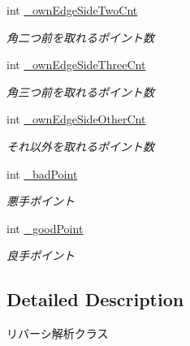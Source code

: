 \begin{DoxyCompactItemize}
int \hyperlink{class_reversi_wpf_1_1_reversi_anz_ab75875631362cfdda69f7d980a7406cd}{\+\_\+own\+Edge\+Side\+Two\+Cnt}
\begin{DoxyCompactList}\small\item\em 角二つ前を取れるポイント数 \end{DoxyCompactList}\item 
\mbox{\label{class_reversi_wpf_1_1_reversi_anz_a68cbd891eb9cf08e24855a4e518ab3f6}} 
int \hyperlink{class_reversi_wpf_1_1_reversi_anz_a68cbd891eb9cf08e24855a4e518ab3f6}{\+\_\+own\+Edge\+Side\+Three\+Cnt}
\begin{DoxyCompactList}\small\item\em 角三つ前を取れるポイント数 \end{DoxyCompactList}\item 
\mbox{\label{class_reversi_wpf_1_1_reversi_anz_a4ee0cb9ba8870e9f5a204733cd012ff7}} 
int \hyperlink{class_reversi_wpf_1_1_reversi_anz_a4ee0cb9ba8870e9f5a204733cd012ff7}{\+\_\+own\+Edge\+Side\+Other\+Cnt}
\begin{DoxyCompactList}\small\item\em それ以外を取れるポイント数 \end{DoxyCompactList}\item 
\mbox{\label{class_reversi_wpf_1_1_reversi_anz_a2450dc6a189f0c9f3742a92965bbecc0}} 
int \hyperlink{class_reversi_wpf_1_1_reversi_anz_a2450dc6a189f0c9f3742a92965bbecc0}{\+\_\+bad\+Point}
\begin{DoxyCompactList}\small\item\em 悪手ポイント \end{DoxyCompactList}\item 
\mbox{\label{class_reversi_wpf_1_1_reversi_anz_af8a15b4619e5a3255c5f78c39cda73af}} 
int \hyperlink{class_reversi_wpf_1_1_reversi_anz_af8a15b4619e5a3255c5f78c39cda73af}{\+\_\+good\+Point}
\begin{DoxyCompactList}\small\item\em 良手ポイント \end{DoxyCompactList}\end{DoxyCompactItemize}


\subsection{Detailed Description}
リバーシ解析クラス 

